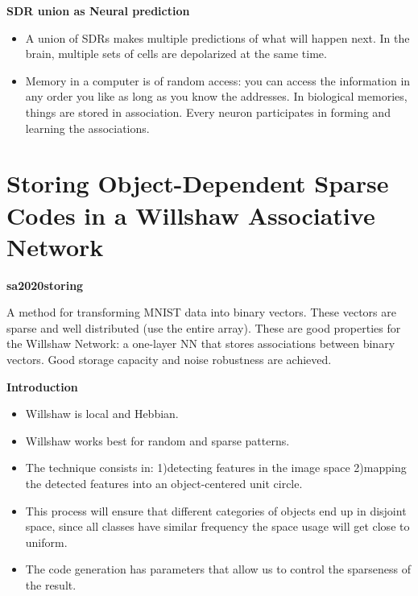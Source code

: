\documentclass{article}
\begin{document}
\textbf{SDR union as Neural prediction}
\begin{itemize}
\item A union of SDRs makes multiple predictions of what will happen next. In the brain, multiple sets of cells are depolarized at the same time. 
\item Memory in a computer is of random access: you can access the information in any order you like as long as you know the addresses. In biological memories, things are stored in association. Every neuron participates in forming and learning the associations.
\end{itemize}

\section{Storing Object-Dependent Sparse Codes in a Willshaw Associative Network}
\textbf{sa2020storing} \cite{sa2020storing}\newline

A method for transforming MNIST data into binary vectors. These vectors are sparse and well distributed (use the entire array). These are good properties for the Willshaw Network: a one-layer NN that stores associations between binary vectors. Good storage capacity and noise robustness are achieved.

\textbf{Introduction}
\begin{itemize}
\item Willshaw is local and Hebbian.
\item Willshaw works best for random and sparse patterns.
\item The technique consists in:
1)detecting features in the image space
2)mapping the detected features into an object-centered unit circle.
\item This process will ensure that different categories of objects end up in disjoint space, since all classes have similar frequency the space usage will get close to uniform.
\item The code generation has parameters that allow us to control the sparseness of the result.
\end{itemize}
\end{document}
